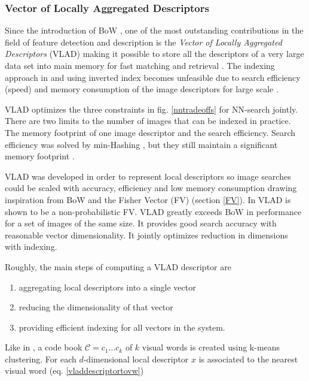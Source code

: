 \documentclass[english,12pt,a4paper,pdftex,elec,utf8, table]{aaltothesis}
\begin{document}
\subsubsection{Vector of Locally Aggregated Descriptors}
Since the introduction of BoW \cite{Sivic2003}, one of the most outstanding contributions in the field of feature detection and description is the \emph{Vector of Locally Aggregated Descriptors} (VLAD) making it possible to store all the descriptors of a very large data set into main memory for fast matching and retrieval \cite{Arandjelovic2013}. The indexing approach in \cite{Sivic2003} and \cite{Jegou2008} using inverted index becomes unfeasible due to search efficiency (speed) and memory consumption of the image descriptors for large scale \cite{Jegou2010}.

VLAD optimizes the three constraints in fig. \ref{nntradeoffs} for NN-search jointly. There are two limits to the number of images that can be indexed in practice. The memory footprint of one image descriptor and the search efficiency. Search efficiency was solved by min-Hashing \cite{Chum2008}, \cite{Chum2009} but they still maintain a significant memory footprint \cite{Jegou2010}.

VLAD was developed in order to represent local descriptors so image searches could be scaled with accuracy, efficiency and low memory consumption drawing inspiration from BoW and the Fisher Vector (FV) (section \ref{FV}). In \cite{Jegou2012} VLAD is shown to be a non-probabilistic FV. VLAD greatly exceeds BoW in performance for a set of images of the same size. It provides good search accuracy with reasonable vector dimensionality. It jointly optimizes reduction in dimensions with indexing. \cite{Jegou2010}

Roughly, the main steps of computing a VLAD descriptor are
\begin{enumerate}
\item aggregating local descriptors into a single vector
\item reducing the dimensionality of that vector
\item providing efficient indexing for all vectors in the system.
\end{enumerate}

Like in \cite{Sivic2003}, \cite{Jegou2011} a code book $\mathcal{C}={c_1 \ldots c_k}$ of $k$ visual words is created using k-means clustering. For each $d$-dimensional local descriptor $x$ is associated to the nearest visual word (eq. \ref{vladdescriptortovw})
\end{document}
